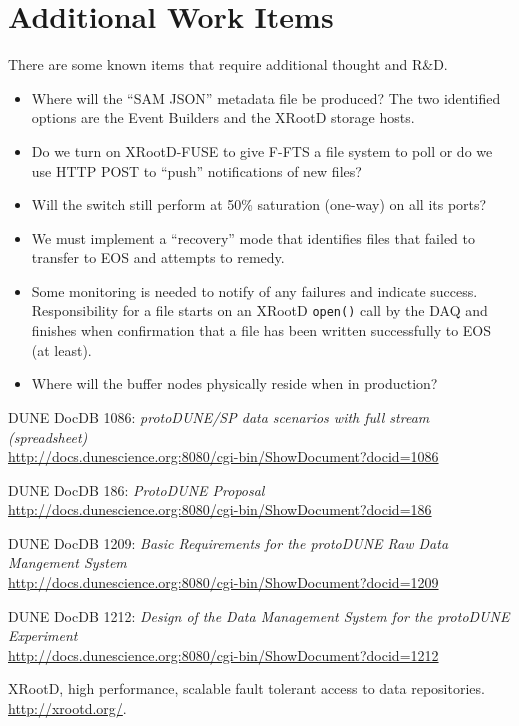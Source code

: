 \documentclass[pdftex,12pt,letter]{article}
\newcommand{\xrd}{XRootD\xspace}
\begin{document}
\section{Additional Work Items}
There are some known items that require additional thought and R\&D.
\begin{itemize}
\item Where will the ``SAM JSON'' metadata file be produced?  The two
  identified options are the Event Builders and the \xrd storage
  hosts.  
\item Do we turn on \xrd-FUSE to give F-FTS a file system to poll or
  do we use HTTP POST to ``push'' notifications of new files?
\item Will the switch still perform at 50\% saturation (one-way) on
  all its ports?
\item We must implement a ``recovery'' mode that identifies files that
  failed to transfer to EOS and attempts to remedy.
\item Some monitoring is needed to notify of any failures and indicate
  success.  Responsibility for a file starts on an \xrd
  \texttt{open()} call by the DAQ and finishes when confirmation that
  a file has been written successfully to EOS (at least).  
\item Where will the buffer nodes physically reside when in production?
\end{itemize}



\begin{thebibliography}{1}
{DUNE DocDB 1086: \textit{ protoDUNE/SP data scenarios with full stream (spreadsheet)}}\\
\url{http://docs.dunescience.org:8080/cgi-bin/ShowDocument?docid=1086}

{DUNE DocDB 186: \textit{ ProtoDUNE Proposal}}\\
\url{http://docs.dunescience.org:8080/cgi-bin/ShowDocument?docid=186}


{DUNE DocDB 1209: \textit{Basic Requirements for the protoDUNE Raw Data Mangement System}}\\
\url{http://docs.dunescience.org:8080/cgi-bin/ShowDocument?docid=1209}


{DUNE DocDB 1212: \textit{Design of the Data Management System for the protoDUNE Experiment}}\\
\url{http://docs.dunescience.org:8080/cgi-bin/ShowDocument?docid=1212}



{XRootD, high performance, scalable fault tolerant access to data  repositories}.\\
  \url{http://xrootd.org/}.

\end{thebibliography}
\end{document}
